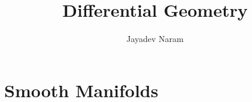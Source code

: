 \documentclass[11pt,a4paper]{article}
\author{Jayadev Naram}
\title{Differential Geometry}
\begin{document}
\date{}
\maketitle
\tableofcontents

\newpage

\theoremstyle{plain}
\newtheorem{theorem}{Theorem}[section]
\newtheorem{corollary}{Corollary}[theorem]

\newtheorem{lemma}[theorem]{Lemma}
\newtheorem{proposition}[theorem]{Proposition}
\newtheorem{assume}{Assumption}

\theoremstyle{definition}
\newtheorem{definition}[theorem]{Definition}
\newtheorem{example}[theorem]{Example}
\newtheorem{remark}[theorem]{Remark}

\newcommand{\R}{\mathbb{R}}
\newcommand{\B}{\mathbb{B}}
\newcommand{\A}{\mathcal{A}}
\newcommand{\M}{\mathcal{M}}
\newcommand{\N}{\mathcal{N}}
\newcommand{\h}{\mathcal{H}}
\newcommand{\T}{\mathcal{T}}
\newcommand{\Prob}{\mathbb{P}}
\newcommand{\Dist}{\mathcal{D}}
\newcommand{\perpProj}{\mathcal{P}^\perp}
\newcommand{\bb}{\mathbb{B}}
\newcommand{\Sprod}{\mathbb{S}_{xy}}
\newcommand{\highlight}[1]{\underline{\textit{\textbf{#1}}}}
\newcommand{\mapping}[3]{#1:#2\rightarrow #3}
\newcommand{\doubt}{\highlight{[??]}}
\newcommand{\Cinf}{\mathcal{C}^\infty}
\newcommand{\bigvert}[2]{\left.#1\right|_{#2}}
\newcommand{\sdnn}[1]{${#1}$}
\newcommand{\bsdnn}[1]{$\boldsymbol{#1}$}
\newcommand{\ifthen}[2]{\textbf{(#1)}\boldsymbol{\implies}\textbf{(#2)}}
\newcommand{\bsdn}[1]{\boldsymbol{#1}}
\newcommand{\forward}{$(\implies)$\ }
\newcommand{\converse}{$(\impliedby)$\ }
\newcommand{\Lt}[1]{\underset{#1\rightarrow 0}{Lt}}
\newcommand{\norm}[1]{\|#1\|}
\newcommand{\dparder}[2]{\dfrac{\partial #1}{\partial x_{#2}}}
\newcommand{\fparder}[2]{\frac{\partial #1}{\partial x_{#2}}}
\newcommand{\parder}[2]{\partial #1/\partial x_{#2}}
\newcommand{\parop}[1]{\dfrac{\partial}{\partial x_{#1}}}
\newcommand{\innerproduct}[2]{\langle #1, #2 \rangle}
\newcommand{\metric}[2]{[#1, #2]}
\newcommand{\genst}{St_B(n,p)}
\newcommand{\igenst}[1]{St_{B_{#1}}(n_{#1},p)}
\newcommand{\realmat}[2]{\R^{#1\times #2}}
\newcommand{\Skew}{\mathcal{S}_{skew}(p)}
\newcommand{\Sym}{\mathcal{S}_{sym}(p)}
\newcommand{\XperpB}{X_{B^\perp}}
\newcommand{\polarRetr}{R^{polar}_X}
\newcommand{\qrRetr}{R^{QR}_X}
\newcommand{\vectransport}{\mathcal{T}}
\newcommand{\grad}{\text{grad}\,}
\newcommand{\hess}{\text{Hess}\,}

\section{Smooth Manifolds}
\end{document}
